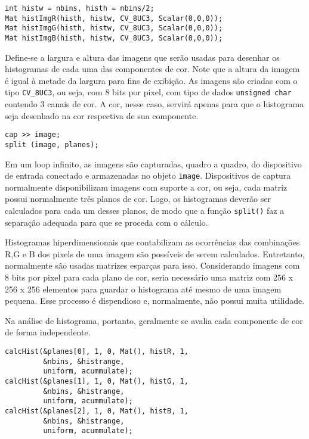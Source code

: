 \documentclass[11pt]{amsbook}
\begin{document}
\begin{verbatim}
int histw = nbins, histh = nbins/2;
Mat histImgR(histh, histw, CV_8UC3, Scalar(0,0,0));
Mat histImgG(histh, histw, CV_8UC3, Scalar(0,0,0));
Mat histImgB(histh, histw, CV_8UC3, Scalar(0,0,0));
\end{verbatim}

Define-se a largura e altura das imagens que serão usadas para
desenhar os histogramas de cada uma das componentes de cor. Note que a
altura da imagem é igual à metade da largura para fins de exibição. As
imagens são criadas com o tipo \texttt{CV_8UC3}, ou seja, com 8 bits por
pixel, com tipo de dados \texttt{unsigned char} contendo 3 canais de cor. A
cor, nesse caso, servirá apenas para que o histograma seja desenhado
na cor respectiva de sua componente.


\begin{verbatim}
cap >> image;
split (image, planes);
\end{verbatim}

Em um loop infinito, as imagens são capturadas, quadro a quadro, do
dispositivo de entrada conectado e armazenadas no objeto
\texttt{image}. Dispositivos de captura normalmente disponibilizam imagens
com suporte a cor, ou seja, cada matriz possui normalmente três planos
de cor. Logo, os histogramas deverão ser calculados para cada um
desses planos, de modo que a função \texttt{split()} faz a separação adequada
para que se proceda com o cálculo.


Histogramas hiperdimensionais que contabilizam as ocorrências das
combinações R,G e B dos pixels de uma imagem são possíveis de serem
calculados. Entretanto, normalmente são usadas matrizes esparças para
isso. Considerando imagens com 8 bits por pixel para cada plano de
cor, seria necessário uma matriz com 256 x 256 x 256 elementos para
guardar o histograma até mesmo de uma imagem pequena. Esse processo é
dispendioso e, normalmente, não possui muita utilidade.


Na análise de histograma, portanto, geralmente se avalia cada
componente de cor de forma independente.


\begin{verbatim}
calcHist(&planes[0], 1, 0, Mat(), histR, 1,
         &nbins, &histrange,
         uniform, acummulate);
calcHist(&planes[1], 1, 0, Mat(), histG, 1,
         &nbins, &histrange,
         uniform, acummulate);
calcHist(&planes[2], 1, 0, Mat(), histB, 1,
         &nbins, &histrange,
         uniform, acummulate);
\end{verbatim}
\end{document}
